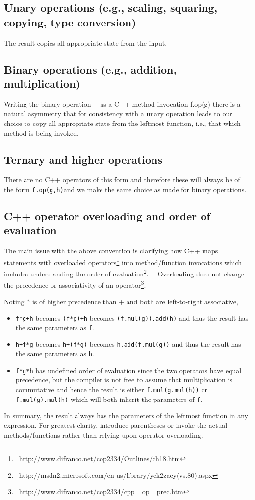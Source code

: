 \documentclass[letterpaper]{article}
\newcommand\liststyleLvi{%
\renewcommand\labelitemi{${\bullet}$}
\renewcommand\labelitemii{${\circ}$}
\renewcommand\labelitemiii{${\blacksquare}$}
\renewcommand\labelitemiv{${\bullet}$}
}
\begin{document}
\subsection{Unary operations (e.g., scaling, squaring, copying, type conversion)}
The result copies all appropriate state from the input.

\subsection{Binary operations (e.g., addition, multiplication)}
Writing the binary operation \ \ as a C++ method invocation f.op(g) there is a natural asymmetry that for consistency
with a unary operation leads to our choice to copy all appropriate state from the leftmost function, i.e., that which
method is being invoked.

\subsection{Ternary and higher operations}
There are no C++ operators of this form and therefore these will always be of the form \texttt{f.op(g,h)}and we make the
same choice as made for binary operations.

\subsection{C++ operator overloading and order of evaluation}
The main issue with the above convention is clarifying how C++ maps statements with overloaded
operators\footnote{\ \textrm{http://www.difranco.net/cop2334/Outlines/ch18.htm}} into method/function invocations which
includes understanding the order of
evaluation\footnote{\ \textrm{http://msdn2.microsoft.com/en-us/library/yck2zaey(vs.80).aspx}}. \ \ Overloading does not
change the precedence or associativity of an operator\footnote{\ \textrm{http://www.difranco.net/cop2334/cpp \_op
\_prec.htm}}. \ \ \ 

Noting * is of higher precedence than + and both are left-to-right associative,

\liststyleLvi
\begin{itemize}
\item \texttt{f*g+h} becomes \texttt{(f*g)+h} becomes \texttt{(f.mul(g)).add(h)} and thus the result has the same
parameters as \texttt{f}.
\item \texttt{h+f*g} becomes \texttt{h+(f*g)} becomes \texttt{h.add(f.mul(g))} and thus the result has the same
parameters as \texttt{h}.
\item \texttt{f*g*h} has undefined order of evaluation since the two operators have equal precedence, but the compiler
is not free to assume that multiplication is commutative and hence the result is either \texttt{f.mul(g.mul(h))} or
\texttt{f.mul(g).mul(h)} which will both inherit the parameters of \texttt{f}.
\end{itemize}
In summary, the result always has the parameters of the leftmost function in any expression. For greatest clarity,
introduce parentheses or invoke the actual methods/functions rather than relying upon operator overloading.
\end{document}
